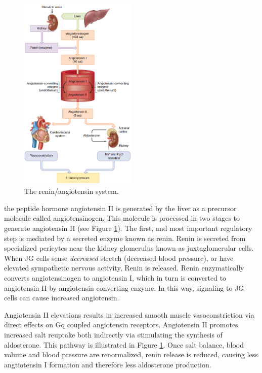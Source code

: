 \documentclass{tufte-handout}
\begin{document}
\begin{figure}
\centering
  \includegraphics[width=0.5\textwidth]{figures/renin-angiotensin}
  \caption{The renin/angiotensin system.}
    \label{fig:renin-angiotensin}
\end{figure}

 the peptide hormone angiotensin II is generated by the liver as a precursor molecule called angiotensinogen.  This molecule is processed in two stages to generate angiotensin II (see Figure \ref{fig:renin-angiotensin}).  The first, and most important regulatory step is mediated by a secreted enzyme known as renin.  Renin is secreted from specialized pericytes near the kidney glomerulus known as juxtaglomerular cells.  When JG cells sense \emph{decreased} stretch (decreased blood pressure), or have elevated sympathetic nervous activity, Renin is released.  Renin enzymatically converts angiotensinogen to angiotensin I, which in turn is converted to angiotensin II by angiotensin converting enzyme.  In this way, signaling to JG cells can cause increased angiotensin.  

Angiotensin II elevations results in increased smooth muscle vasoconstriction via direct effects on Gq coupled angiotensin receptors.  Angiotensin II promotes increased salt reuptake both indirectly via stimulating the synthesis of aldosterone.  This pathway is illustrated in Figure \ref{fig:renin-angiotensin}.  Once salt balance, blood volume and blood pressure are renormalized, renin release is reduced, causing less angtiotensin I formation and therefore less aldosterone production.
\end{document}

